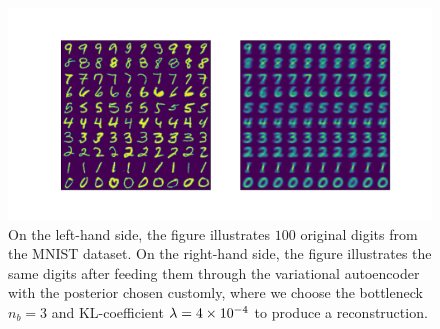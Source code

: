 \begin{figure}
\begin{center}
      \includegraphics[trim = 15mm 10mm 15mm 15mm, clip, width=\linewidth]{convolutional_VAE_new_idea_KL_4e-2_10k_epochs_3D_inference}
\end{center}
\caption{On the left-hand side, the figure illustrates $100$ original digits from the MNIST dataset. On the right-hand side, the figure illustrates the same digits after feeding them through the variational autoencoder with the posterior chosen customly, where we choose the bottleneck $n_b=3$ and KL-coefficient $\lambda = \num{4e-4}$ to produce a reconstruction.}\label{fig:convolutional_VAE_new_idea_KL_4e-2_10k_epochs_3D_inference}
\end{figure}
